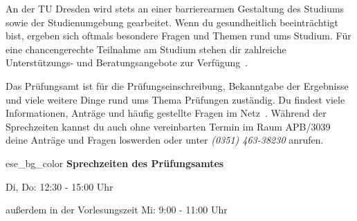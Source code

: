 
An der TU Dresden wird stets an einer barrierearmen Gestaltung des Studiums sowie der Studienumgebung gearbeitet.
Wenn du gesundheitlich beeinträchtigt bist, ergeben sich oftmals besondere Fragen und Themen rund ums Studium.
Für eine chancengerechte Teilnahme am Studium stehen dir zahlreiche Unterstützungs- und Beratungsangebote zur Verfügung~.


\label{sec:pruefungsamt}
Das Prüfungsamt ist für die Prüfungseinschreibung, Bekanntgabe der Ergebnisse und viele weitere Dinge rund ums Thema Prüfungen zuständig.
Du findest viele Informationen, Anträge und häufig gestellte Fragen im Netz~.
Während der Sprechzeiten kannst du auch ohne vereinbarten Termin im Raum APB/3039 deine Anträge und Fragen loswerden oder unter \textit{(0351) 463-38230} anrufen.

\begin{awesomeblock}{2pt}{\faCalendar*[regular]}{ese_bg_color}
    \textbf{Sprechzeiten des Prüfungsamtes}

    Di, Do: 12:30 - 15:00 Uhr

    außerdem in der Vorlesungszeit Mi: 9:00 - 11:00 Uhr
\end{awesomeblock}

